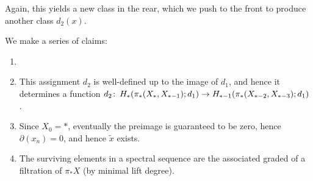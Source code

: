 \begin{figure*}[h]
\begin{center}
\end{center}
\end{figure*}

\noindent
Again, this yields a new class in the rear, which we push to the front to produce another class $d_2(x)$.

We make a series of claims:
\begin{enumerate}
    \item {}
    \item This assignment $d_2$ is well-defined up to the image of $d_1$, and hence it determines a function $d_2\colon\thinspace H_*(\pi_*(X_*, X_{*-1}); d_1) \to H_{*-1}(\pi_*(X_{*-2}, X_{*-3}); d_1)$. 
    \item Since $X_0 = *$, eventually the preimage is guaranteed to be zero, hence $\partial(x_n) = 0$, and hence $\widetilde x$ exists.
    \item The surviving elements in a spectral sequence are the associated graded of a filtration of $\pi_* X$ (by minimal lift degree).
\end{enumerate}

